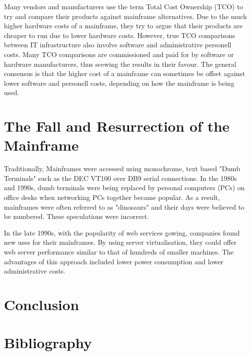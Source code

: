 \documentclass[a4paper,12pt]{article}
\begin{document}
Many vendors and manufacturers use the term Total Cost Ownership (TCO)
to try and compare their products against mainframe alternatives. Due to
the much higher hardware costs of a mainframe, they try to argue that
their products are cheaper to run due to lower hardware costs. However,
true TCO comparisons between IT infrastructure also involve software
and administrative personell costs. Many TCO comparisons are
commissioned and paid for by software or hardware manufacturers, thus
scewing the results in their favour. The general consensus is that the
higher cost of a mainframe can sometimes be offset against lower
software and personell costs, depending on how the mainframe is being
used.

\section{The Fall and Resurrection of the Mainframe}

Traditionally, Mainframes were accessed using monochrome, text 
based "Dumb Terminals" such as the DEC VT100 over DB9 serial 
connections. In the 1980s and 1990s, dumb terminals were being replaced
by personal computers (PCs) on office desks when networking PCs together
became popular. As a result, mainframes were often referred to as
"dinosaurs" and their days were believed to be numbered. These
speculations were incorrect.


In the late 1990s, with the popularity of web services gowing, 
companies found new uses for their mainframes. By using server
virtualisation, they could offer web server performance similar 
to that of hundreds of smaller machines. The advantages of this
approach included lower power consumption and lower administrative 
costs. \cite[The growth of e-business has also dramatically increased the 
number of backend transactions processed by tried-and-true mainframe 
software as well as the size and throughput of databases. In late 2004,
IBM's mainframe revenues were increasing even with price reductions, 
thanks to attractive TCOs.]{m1}

\section{Conclusion}

\section{Bibliography}


\end{document}
